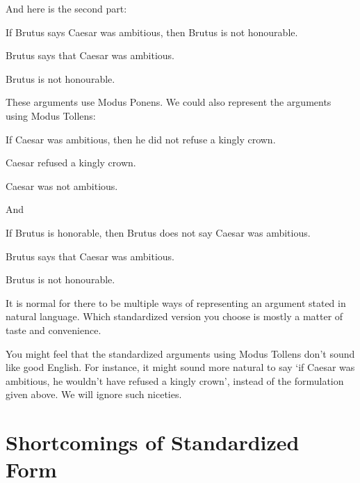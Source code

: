  And here is the second part:

 \begin{argument*}

 \aitem If Brutus says Caesar was ambitious, then Brutus is not honourable.  
 

 \aitem Brutus says that Caesar was ambitious. 

 \aitem Brutus is not honourable. 

\end{argument*}

These arguments use Modus Ponens. We could also represent the arguments using 
Modus Tollens:

 \begin{argument*}

  \aitem If Caesar was ambitious, then he did not refuse a kingly 
  crown.


  \aitem Caesar refused a kingly crown.

  \aitem Caesar was not ambitious.

 \end{argument*}

 And 

 \begin{argument*}

 \aitem If Brutus is honorable, then Brutus does not say Caesar was 
 ambitious.


 \aitem Brutus says that Caesar was ambitious. 

 \aitem Brutus is not honourable. 

\end{argument*}

It is normal for there to be multiple ways of representing an argument stated in 
natural language. Which standardized version you choose is mostly a matter of 
taste and convenience.

You might feel that the standardized arguments using Modus Tollens don't sound 
like good English. For instance, it might sound more natural to say `if Caesar 
was ambitious, he wouldn't have refused a kingly crown', instead of the 
formulation given above. We will ignore such niceties.


\section{Shortcomings of Standardized Form}\label{sec:sf-shortcomings}

